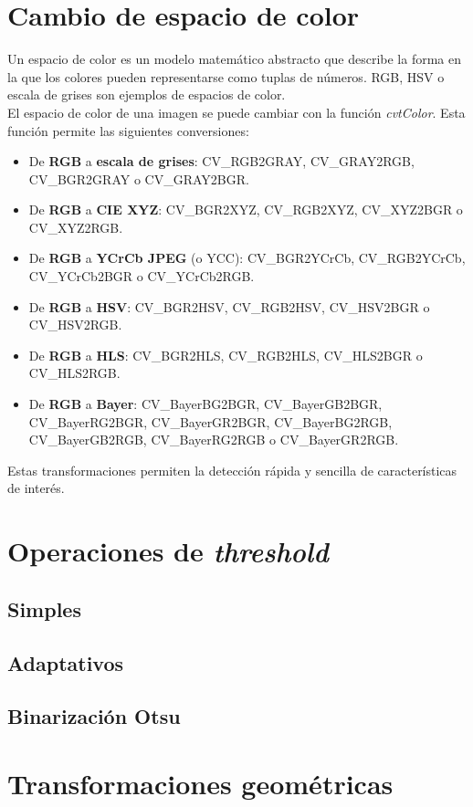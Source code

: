 \section{Cambio de espacio de color}
Un espacio de color es un modelo matemático abstracto que describe 
la forma en la que los colores pueden representarse como tuplas de 
números. RGB, HSV o escala de grises son ejemplos de espacios de color. \\
El espacio de color de una imagen se puede cambiar con la función \emph{cvtColor}.
Esta función permite las siguientes conversiones:
\begin{itemize}
\item De \textbf{RGB} a \textbf{escala de grises}: CV_RGB2GRAY, CV_GRAY2RGB, CV_BGR2GRAY 
  o CV_GRAY2BGR.
\item De \textbf{RGB} a \textbf{CIE XYZ}: CV_BGR2XYZ, CV_RGB2XYZ, CV_XYZ2BGR o CV_XYZ2RGB.
\item De \textbf{RGB} a \textbf{YCrCb JPEG} (o YCC): CV_BGR2YCrCb, CV_RGB2YCrCb, CV_YCrCb2BGR 
  o CV_YCrCb2RGB.
\item De \textbf{RGB} a \textbf{HSV}: CV_BGR2HSV, CV_RGB2HSV, CV_HSV2BGR o CV_HSV2RGB.
\item De \textbf{RGB} a \textbf{HLS}: CV_BGR2HLS, CV_RGB2HLS, CV_HLS2BGR o CV_HLS2RGB.
\item De \textbf{RGB} a \textbf{Bayer}: CV_BayerBG2BGR, CV_BayerGB2BGR, CV_BayerRG2BGR, 
  CV_BayerGR2BGR, CV_BayerBG2RGB, CV_BayerGB2RGB, CV_BayerRG2RGB o CV_BayerGR2RGB.
\end{itemize}
Estas transformaciones permiten la detección rápida y sencilla de características
de interés.


\section{Operaciones de \emph{threshold}}
\subsection{Simples}
\subsection{Adaptativos}
\subsection{Binarización Otsu}

\section{Transformaciones geométricas}
